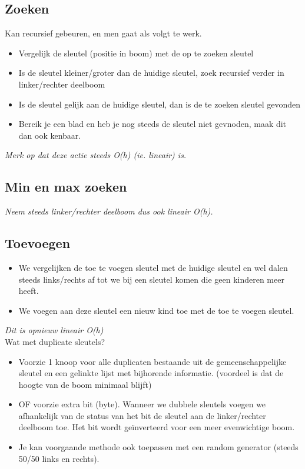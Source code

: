 \documentclass[11pt]{article}
\begin{document}
\subsection{Zoeken}
Kan recursief gebeuren, en men gaat als volgt te werk.
\begin{itemize}
	\item Vergelijk de sleutel (positie in boom) met de op te zoeken sleutel
	\item Is de sleutel kleiner/groter dan de huidige sleutel, zoek recursief verder in linker/rechter deelboom
	\item Is de sleutel gelijk aan de huidige sleutel, dan is de te zoeken sleutel gevonden
	\item Bereik je een blad en heb je nog steeds de sleutel niet gevnoden, maak dit dan ook kenbaar.
\end{itemize}

\emph{Merk op dat deze actie steeds O(h) (ie. lineair) is.}

\subsection{Min en max zoeken}
\emph{Neem steeds linker/rechter deelboom dus ook lineair O(h).}

\subsection{Toevoegen}
\begin{itemize}
	\item We vergelijken de toe te voegen sleutel met de huidige sleutel en wel dalen steeds links/rechts af tot we bij een sleutel komen die geen kinderen meer heeft. 
	\item We voegen aan deze sleutel een nieuw kind toe met de toe te voegen sleutel.
\end{itemize}
\emph{Dit is opnieuw lineair O(h)} \\
Wat met duplicate sleutels?
\begin{itemize}
	\item Voorzie 1 knoop voor alle duplicaten bestaande uit de gemeenschappelijke sleutel en een gelinkte lijst met bijhorende informatie. (voordeel is dat de hoogte van de boom minimaal blijft)
	\item OF voorzie extra bit (byte). Wanneer we dubbele sleutels voegen we afhankelijk van de status van het bit de sleutel aan de linker/rechter deelboom toe. Het bit wordt ge\"{i}nverteerd voor een meer evenwichtige boom.
	\item Je kan voorgaande methode ook toepassen met een random generator (steeds 50/50 links en rechts).
\end{itemize}
\end{document}
